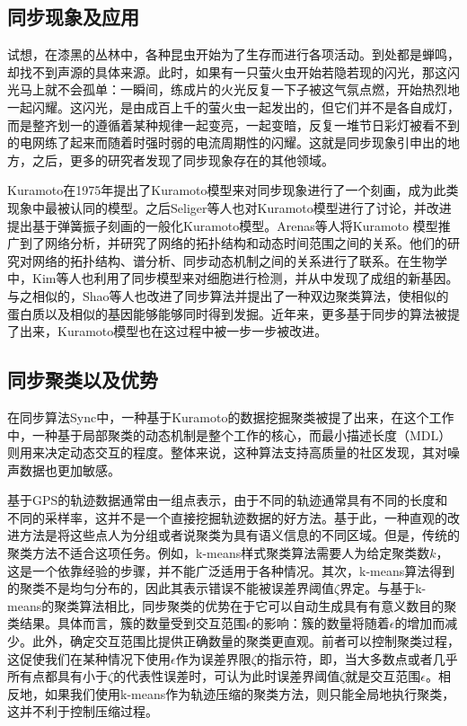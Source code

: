 \subsection{同步现象及应用}
试想，在漆黑的丛林中，各种昆虫开始为了生存而进行各项活动。到处都是蝉鸣，却找不到声源的具体来源。此时，如果有一只萤火虫开始若隐若现的闪光，那这闪光马上就不会孤单：一瞬间，练成片的火光反复一下子被这气氛点燃，开始热烈地一起闪耀。这闪光，是由成百上千的萤火虫一起发出的，但它们并不是各自成灯，而是整齐划一的遵循着某种规律一起变亮，一起变暗，反复一堆节日彩灯被看不到的电网练了起来而随着时强时弱的电流周期性的闪耀。这就是同步现象引申出的地方，之后，更多的研究者发现了同步现象存在的其他领域\cite{seliger2002plasticity,network,sync,shaoBook,shao2015community,effective,shao2016scalable,shao2017robust,shao2017Cosync,kis}。

Kuramoto在1975年提出了Kuramoto模型来对同步现象进行了一个刻画，成为此类现象中最被认同的模型。之后Seliger等人\cite{seliger2002plasticity}也对Kuramoto模型进行了讨论，并改进提出基于弹簧振子刻画的一般化Kuramoto模型。Arenas等人\cite{network}将Kuramoto 模型推广到了网络分析，并研究了网络的拓扑结构和动态时间范围之间的关系。他们的研究对网络的拓扑结构、谱分析、同步动态机制之间的关系进行了联系。在生物学中，Kim等人\cite{gene}也利用了同步模型来对细胞进行检测，并从中发现了成组的新基因。与之相似的，Shao等人\cite{shao2017Cosync}也改进了同步算法并提出了一种双边聚类算法，使相似的蛋白质以及相似的基因能够能够同时得到发掘。近年来，更多基于同步的算法被提了出来\cite{sync,shao2017robust,Shao2010,effective,shaoBook}，Kuramoto模型也在这过程中被一步一步被改进。


\subsection{同步聚类以及优势}
在同步算法Sync\cite{sync}中，一种基于Kuramoto的数据挖掘聚类被提了出来，在这个工作中，一种基于局部聚类的动态机制是整个工作的核心，而最小描述长度（MDL）则用来决定动态交互的程度。整体来说，这种算法支持高质量的社区发现，其对噪声数据也更加敏感。

基于GPS的轨迹数据通常由一组点表示，由于不同的轨迹通常具有不同的长度和不同的采样率，这并不是一个直接挖掘轨迹数据的好方法。基于此，一种直观的改进方法是将这些点人为分组或者说聚类为具有语义信息的不同区域。但是，传统的聚类方法不适合这项任务。例如，k-means样式聚类算法需要人为给定聚类数$k$，这是一个依靠经验的步骤，并不能广泛适用于各种情况。其次，k-means算法得到的聚类不是均匀分布的，因此其表示错误不能被误差界阈值$\zeta$界定。与基于k-means的聚类算法相比，同步聚类的优势在于它可以自动生成具有有意义数目的聚类结果。具体而言，簇的数量受到交互范围$\epsilon$的影响：簇的数量将随着$\epsilon$的增加而减少。此外，确定交互范围比提供正确数量的聚类更直观。前者可以控制聚类过程，这促使我们在某种情况下使用$\epsilon$作为误差界限$\zeta$的指示符，即，当大多数点或者几乎所有点都具有小于$\zeta$的代表性误差时，可认为此时误差界阈值$\zeta$就是交互范围$\epsilon$。相反地，如果我们使用k-means作为轨迹压缩的聚类方法，则只能全局地执行聚类，这并不利于控制压缩过程。

